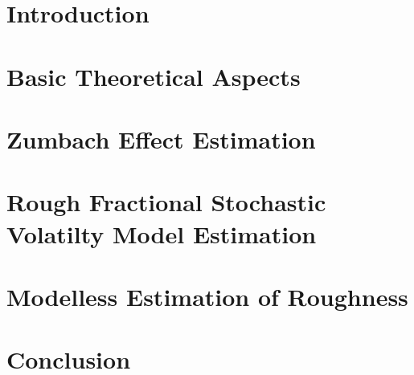 


    \maketitlepage


    \begin{abstract}
        
    \end{abstract}

    \tableofcontents

    \listoffigures
    \listoftables

    \setcounter{page}{3}

    \chapter*{Introduction}

        

    \chapter{Basic Theoretical Aspects}

        

    \chapter{Zumbach Effect Estimation}

        

        

    \chapter{Rough Fractional Stochastic Volatilty Model Estimation}

        

        

    \chapter{Modelless Estimation of Roughness}

        

    \chapter*{Conclusion}

        

    \printbibliography

    
